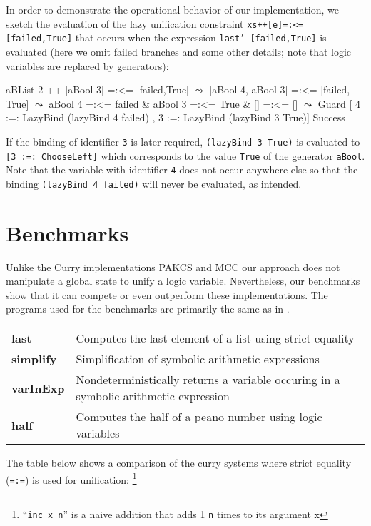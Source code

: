 \documentclass{llncs}
\newcommand{\code}[1]{\mbox{\small\texttt{#1}}}
\newcommand{\ccode}[1]{``\code{#1}''}
\begin{document}
In order to demonstrate the operational behavior of our implementation,
we sketch the evaluation of the lazy unification constraint
\code{xs++[e]=:<=[failed,True]} that occurs when the expression
\code{last' [failed,True]} is evaluated (here we omit failed branches
and some other details; note that logic variables are replaced
by generators):
\begin{haskell}
  aBList 2 ++ [aBool 3] =:<= [failed,True]
  $\leadsto$ [aBool 4, aBool 3] =:<= [failed, True]
  $\leadsto$ aBool 4 =:<= failed & aBool 3 =:<= True & [] =:<= []
  $\leadsto$ Guard [ 4 :=: LazyBind (lazyBind 4 failed)
           , 3 :=: LazyBind (lazyBind 3 True)] Success
\end{haskell}
If the binding of identifier \code{3} is later required,
\code{(lazyBind 3 True)} is evaluated to \code{[3 :=: ChooseLeft]}
which corresponds to the value \code{True} of the generator \code{aBool}.
Note that the variable with identifier \code{4} does not occur
anywhere else so that the binding \code{(lazyBind 4 failed)}
will never be evaluated, as intended.


         
\section{Benchmarks}
\label{sec:Benchmarks}

Unlike the Curry implementations PAKCS and MCC our approach does
not manipulate a global state to unify a logic variable. Nevertheless,
our benchmarks show that it can compete or even outperform these 
implementations.
The programs used for the benchmarks are primarily the same as in \cite{AntoyHanus05LOPSTR}.

\begin{tabular}{l l}
\bf{last}& Computes the last element of a list using strict equality\\
\bf{simplify}& Simplification of symbolic arithmetic expressions\\
\bf{varInExp}& Nondeterministically returns a variable occuring
                in a symbolic arithmetic expression \\
\bf{half}& Computes the half of a peano number using logic variables\\
\end{tabular}

The table below shows a comparison of the curry systems where
strict equality (\code{=:=}) is used for unification:
\footnote{\ccode{inc x n} is a naive addition that adds 1 \code{n} times
          to its argument x }
 
\end{document}
